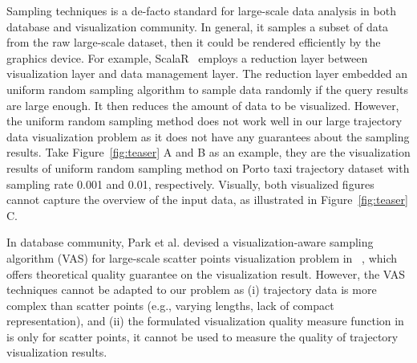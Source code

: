 Sampling techniques is a de-facto standard for large-scale data analysis in both database and visualization community.
In general, it samples a subset of data from the raw large-scale dataset, then it could be rendered efficiently by the graphics device.
For example, ScalaR~\cite{battle2013dynamic} employs a reduction layer between visualization layer and data management layer. 
The reduction layer embedded an uniform random sampling algorithm to sample data randomly if the query results are large enough. 
It then reduces the amount of data to be visualized.
However, the uniform random sampling method does not work well in our large trajectory data visualization problem as it does not have any guarantees about the sampling results.
Take Figure~\ref{fig:teaser} A and B as an example, 
they are the visualization results of uniform random sampling method on Porto taxi trajectory dataset with sampling rate 0.001 and 0.01, respectively.
Visually, both visualized figures cannot capture the overview of the input data, as illustrated in Figure~\ref{fig:teaser} C.

In database community,  Park et al. devised a visualization-aware sampling algorithm (VAS) for large-scale scatter points visualization problem in ~\cite{park2016visualization},
which offers theoretical quality guarantee on the visualization result.
However, the VAS techniques cannot be adapted to our problem as  (i) trajectory data is  more complex than scatter points (e.g., varying lengths, lack of compact representation), 
and  (ii) the formulated visualization quality measure function in~\cite{park2016visualization} is only for scatter points, it cannot be used to measure the quality of trajectory visualization results.

